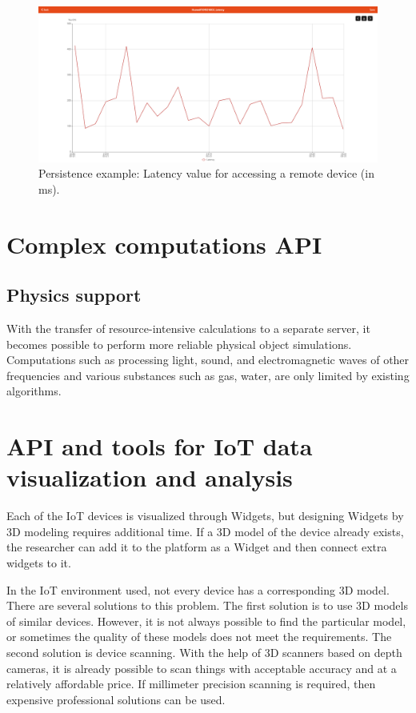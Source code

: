 \begin{figure}
  \centering
  \includegraphics[width=0.9\linewidth]{figures/PersistenceExample.png}
  \caption{Persistence example: Latency value for accessing a remote device (in ms). }
  \label{fig:PersistenceExample-figure}
\end{figure}


\section{Complex computations API}

\subsection{Physics support}

With the transfer of resource-intensive calculations to a separate server, it becomes possible to perform more reliable physical object simulations. Computations such as processing light, sound, and electromagnetic waves of other frequencies and various substances such as gas, water, are only limited by existing algorithms.




\section{API and tools for IoT data visualization and analysis}

Each of the IoT devices is visualized through Widgets, but designing Widgets by 3D modeling requires additional time. If a 3D model of the device already exists, the researcher can add it to the platform as a Widget and then connect extra widgets to it.

In the IoT environment used, not every device has a corresponding 3D model. There are several solutions to this problem. The first solution is to use 3D models of similar devices. However, it is not always possible to find the particular model, or sometimes the quality of these models does not meet the requirements. The second solution is device scanning. With the help of 3D scanners based on depth cameras, it is already possible to scan things with acceptable accuracy and at a relatively affordable price. If millimeter precision scanning is required, then expensive professional solutions can be used.

